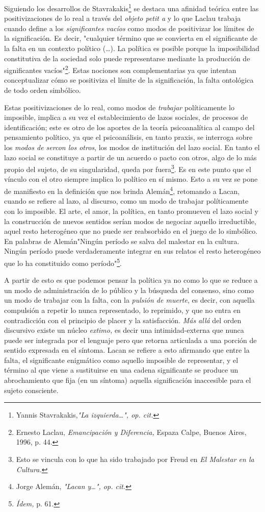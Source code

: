 \documentclass{book}
\begin{document}
Siguiendo los desarrollos de Stavrakakis\footnote{Yannis
  Stavrakakis,\emph{"La izquierda\ldots", op. cit.}} se destaca una
afinidad teórica entre las positivizaciones de lo real a través del
\emph{objeto petit a} y lo que Laclau trabaja cuando define a los
\emph{significantes vacíos} como modos de positivizar los límites de la
significación. Es decir, "cualquier término que se convierta en el
significante de la falta en un contexto político (\dots). La
política es posible porque la imposibilidad constitutiva de la sociedad
solo puede representarse mediante la producción de significantes
vacíos"\footnote{Ernesto Laclau, \emph{Emancipación y Diferencia,}
  Espaza Calpe, Buenos Aires, 1996, p. 44.}. Estas nociones son
complementarias ya que intentan conceptualizar cómo se positiviza el
límite de la significación, la falta ontológica de todo orden simbólico.

Estas positivizaciones de lo real, como modos de \emph{trabajar}
políticamente lo imposible, implica a su vez el establecimiento de lazos
sociales, de procesos de identificación; este es otro de los aportes de
la teoría psicoanalítica al campo del pensamiento político, ya que el
psicoanálisis, en tanto praxis, se interroga sobre los \emph{modos de
sercon los otros}, los modos de institución del lazo social. En tanto el
lazo social se constituye a partir de un acuerdo o pacto con otros, algo
de lo más propio del sujeto, de su singularidad, queda por
fuera\footnote{Esto se vincula con lo que ha sido trabajado por Freud en
  \emph{El Malestar en la Cultura.}}. Es en este punto que el vínculo
con el otro siempre implica lo político en sí mismo. Esto a su vez se
pone de manifiesto en la definición que nos brinda Alemán\footnote{Jorge
  Alemán, \emph{"Lacan y\ldots", op. cit.}}, retomando a Lacan, cuando
se refiere al lazo, al discurso, como un modo de trabajar políticamente
con lo imposible. El arte, el amor, la política, en tanto promueven el
lazo social y la construcción de nuevos sentidos serían modos de
negociar aquello irreductible, aquel resto heterogéneo que no puede ser
reabsorbido en el juego de lo simbólico. En palabras de Alemán"Ningún
período se salva del malestar en la cultura. Ningún período puede
verdaderamente integrar en sus relatos el resto heterogéneo que lo ha
constituido como período"\footnote{\emph{Ídem,} p. 61.}.

A partir de esto es que podemos pensar la política ya no como lo que se
reduce a un modo de administración de lo público y la búsqueda del
consenso, sino como un modo de trabajar con la falta, con la
\emph{pulsión de muerte}, es decir, con aquella compulsión a repetir lo
nunca representado, lo reprimido, y que no entra en contradicción con el
principio de placer y la satisfacción. \emph{Más allá} del orden
discursivo existe un núcleo \emph{extimo,} es decir una
intimidad-externa que nunca puede ser integrada por el lenguaje pero que
retorna articulada a una porción de sentido expresada en el síntoma.
Lacan se refiere a esto afirmando que entre la falta, el significante
enigmático como aquello imposible de representar, y el término al que
viene a sustituirse en una cadena significante se produce un
abrochamiento que fija (en un síntoma) aquella significación inaccesible
para el sujeto consciente.
\end{document}
